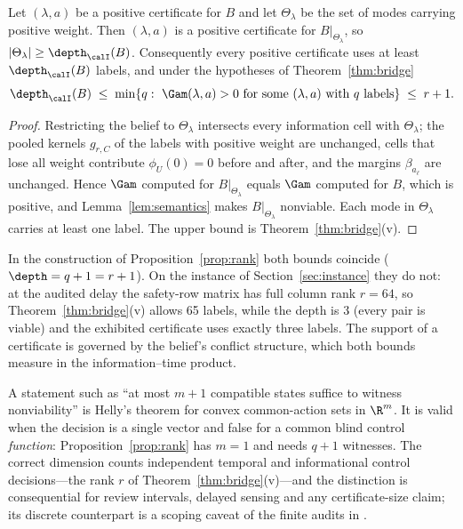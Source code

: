 \begin{proposition}\label{prop:depth}
Let $(\lambda,a)$ be a positive certificate for $B$ and let $\Theta_\lambda$ be the set of modes carrying positive weight. Then $(\lambda,a)$ is a positive certificate for $B|_{\Theta_\lambda}$, so $|\Theta_\lambda|\ge\depth_\calI(B)$. Consequently every positive certificate uses at least $\depth_\calI(B)$ labels, and under the hypotheses of Theorem~\ref{thm:bridge}
\[
\depth_\calI(B)\;\le\;\min\{q:\ \Gam(\lambda,a)>0\text{ for some }(\lambda,a)\text{ with }q\text{ labels}\}\;\le\;r+1 .
\]
\end{proposition}

\begin{proof}
Restricting the belief to $\Theta_\lambda$ intersects every information cell with $\Theta_\lambda$; the pooled kernels $g_{r,C}$ of the labels with positive weight are unchanged, cells that lose all weight contribute $\phi_U(0)=0$ before and after, and the margins $\beta_{a_\ell}$ are unchanged. Hence $\Gam$ computed for $B|_{\Theta_\lambda}$ equals $\Gam$ computed for $B$, which is positive, and Lemma~\ref{lem:semantics} makes $B|_{\Theta_\lambda}$ nonviable. Each mode in $\Theta_\lambda$ carries at least one label. The upper bound is Theorem~\ref{thm:bridge}(v).
\end{proof}

In the construction of Proposition~\ref{prop:rank} both bounds coincide ($\depth=q+1=r+1$). On the instance of Section~\ref{sec:instance} they do not: at the audited delay the safety-row matrix has full column rank $r=64$, so Theorem~\ref{thm:bridge}(v) allows 65 labels, while the depth is $3$ (every pair is viable) and the exhibited certificate uses exactly three labels. The support of a certificate is governed by the belief's conflict structure, which both bounds measure in the information--time product.

\begin{remark}\label{rem:helly}
A statement such as ``at most $m+1$ compatible states suffice to witness nonviability'' is Helly's theorem \cite{Helly1923} for convex common-action sets in $\R^m$. It is valid when the decision is a single vector and false for a common blind control \emph{function}: Proposition~\ref{prop:rank} has $m=1$ and needs $q+1$ witnesses. The correct dimension counts independent temporal and informational control decisions---the rank $r$ of Theorem~\ref{thm:bridge}(v)---and the distinction is consequential for review intervals, delayed sensing and any certificate-size claim; its discrete counterpart is a scoping caveat of the finite audits in \cite{Abaee2026worked}.
\end{remark}
